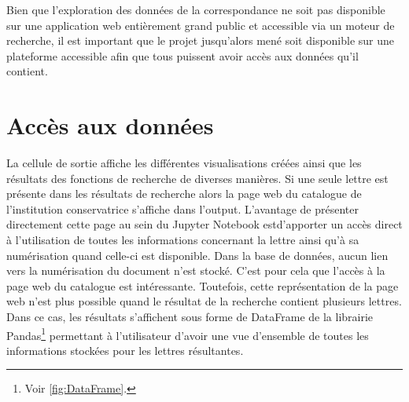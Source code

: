 \documentclass[a4paper, 12pt, twoside]{book}
\begin{document}
Bien que l'exploration des données de la correspondance ne soit pas disponible sur une application web entièrement grand public et accessible via un moteur de recherche, il est important que le projet jusqu'alors mené soit disponible sur une plateforme accessible afin que tous puissent avoir accès aux données qu'il contient. 

\section{Accès aux données}
La cellule de sortie affiche les différentes visualisations créées ainsi que les résultats des fonctions de recherche de diverses manières. Si une seule lettre est présente dans les résultats de recherche alors la page web du catalogue de l'institution conservatrice s'affiche dans l'output. L'avantage de présenter directement cette page au sein du Jupyter Notebook estd'apporter un accès direct à l'utilisation de toutes les informations concernant la lettre ainsi qu'à sa numérisation quand celle-ci est disponible. Dans la base de données, aucun lien vers la numérisation du document n'est stocké. C'est pour cela que l'accès à la page web du catalogue est intéressante. Toutefois, cette représentation de la page web n'est plus possible quand le résultat de la recherche contient plusieurs lettres. Dans ce cas, les résultats s'affichent sous forme de DataFrame de la librairie Pandas\footnote{Voir \autoref{fig:DataFrame}.} permettant à l'utilisateur d'avoir une vue d'ensemble de toutes les informations stockées pour les lettres résultantes. 
\end{document}
